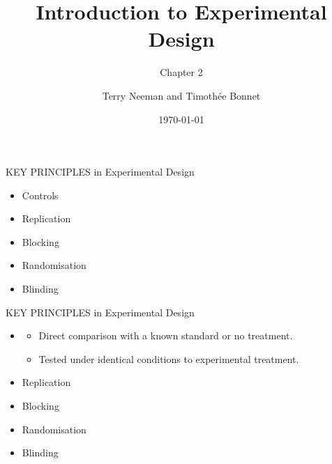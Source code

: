 \documentclass{beamer}
\title{Introduction to Experimental Design}
\subtitle{Chapter 2}
\author{Terry Neeman and Timoth\'ee Bonnet}
\date{\today}
\begin{document}



\begin{frame}{}
\maketitle

\end{frame}

\begin{frame}{KEY PRINCIPLES in Experimental Design}

\begin{alertblock}{}
 \begin{itemize}
  \item Controls
  \item Replication
  \item Blocking
  \item Randomisation
  \item Blinding
 \end{itemize}

\end{alertblock}

\end{frame}


\begin{frame}{KEY PRINCIPLES in Experimental Design}

\begin{alertblock}{}
 \begin{itemize}
  \item {\color{red}{Controls}}
    \begin{itemize}
     \item Direct comparison with a known standard or no treatment.
      \item Tested under identical conditions to experimental treatment.
    \end{itemize}
  \item Replication
  \item Blocking
  \item Randomisation
  \item Blinding
 \end{itemize}

\end{alertblock}

\end{frame}
\end{document}
